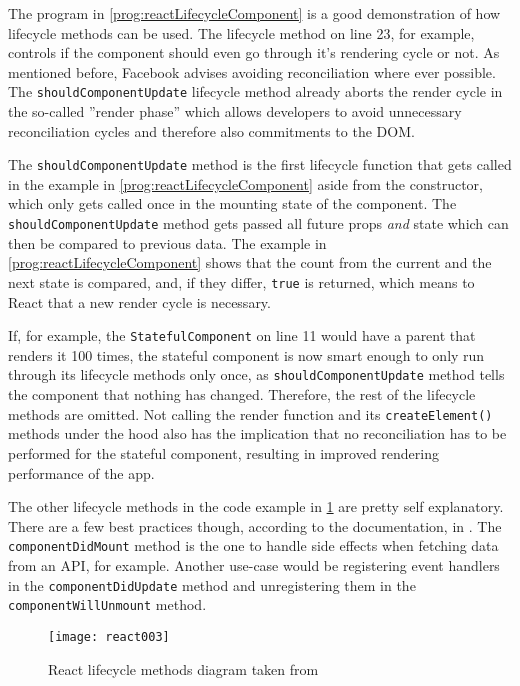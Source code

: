 The program in \ref{prog:reactLifecycleComponent} is a good demonstration of how lifecycle methods can be used. The lifecycle method on line 23, for example, controls if the component should even go through it's rendering cycle or not. As mentioned before, Facebook advises avoiding reconciliation where ever possible. The \texttt{shouldComponentUpdate} lifecycle method already aborts the render cycle in the so-called ''render phase'' which allows developers to avoid unnecessary reconciliation cycles and therefore also commitments to the DOM. 

The \texttt{shouldComponentUpdate} method is the first lifecycle function that gets called in the example in \ref{prog:reactLifecycleComponent} aside from the constructor, which only gets called once in the mounting state of the component. The \texttt{shouldComponentUpdate} method gets passed all future props \emph{and} state which can then be compared to previous data. The example in \ref{prog:reactLifecycleComponent} shows that the count from the current and the next state is compared, and, if they differ, \texttt{true} is returned, which means to React that a new render cycle is necessary. 

If, for example, the \texttt{StatefulComponent} on line 11 would have a parent that renders it 100 times, the stateful component is now smart enough to only run through its lifecycle methods only once, as \texttt{shouldComponentUpdate} method tells the component that nothing has changed. Therefore, the rest of the lifecycle methods are omitted. Not calling the render function and its \texttt{createElement()} methods under the hood also has the implication that no reconciliation has to be performed for the stateful component, resulting in improved rendering performance of the app.

The other lifecycle methods in the code example in \ref{fig:reactLifecycleMethods} are pretty self explanatory. There are a few best practices though, according to the documentation, in \cite{React}. The \texttt{componentDidMount} method is the one to handle side effects when fetching data from an API, for example. Another use-case would be registering event handlers in the \texttt{componentDidUpdate} method and unregistering them in the \texttt{componentWillUnmount} method.

\begin{figure}
  \centering
  \texttt{[image: react003]}
  \caption{React lifecycle methods diagram taken from \cite{ReactRenderCycleDiagram}}
  \label{fig:reactLifecycleMethods}
\end{figure}

